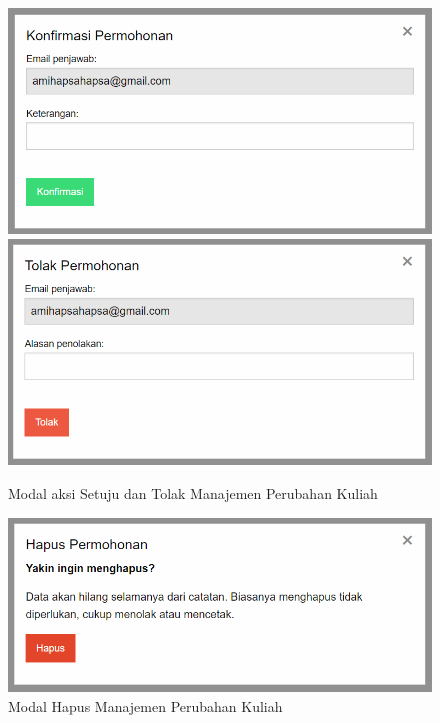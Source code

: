 \documentclass[a4paper,twoside]{article}
\begin{document}
\begin{enumerate}
		
		\begin{figure} [H]
			\centering  
			\includegraphics[scale=0.3]{Modal-Setuju-Manajemen-Perubahan-Kuliah.png}
			\includegraphics[scale=0.3]{Modal-Tolak-Manajemen-Perubahan-Kuliah.png}    
			\caption{Modal aksi Setuju dan Tolak Manajemen Perubahan Kuliah} 
		\end{figure}
		
		
		\begin{figure} [H]
			\centering  
			\includegraphics[scale=0.3]{Modal-Hapus-Manajemen-Perubahan-Kuliah.png}  
			\caption{Modal Hapus Manajemen Perubahan Kuliah} 
		\end{figure}
		

\end{enumerate}
\end{document}
